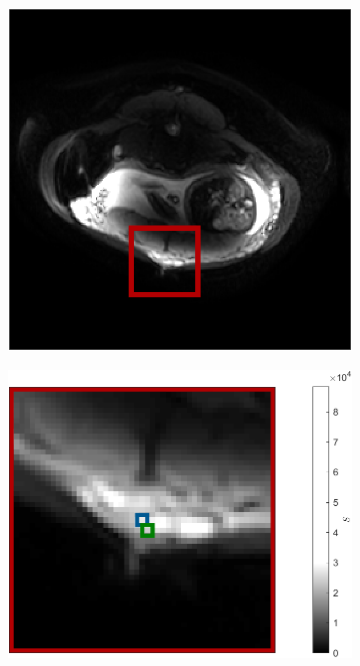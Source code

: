 \begin{figure}
\begin{centering}
\begin{subfigure}{0.4\textwidth}
\begin{centering}
                        \includegraphics[width=\textwidth]{diagrams/results-mri/real-placenta/example-placenta-mri.png}
                        \caption{}
                    \end{centering}
                \end{subfigure}
                \vspace{4mm}
                \begin{subfigure}{0.5\textwidth}
                    \begin{centering}
                        \includegraphics[width=\textwidth]{diagrams/results-mri/real-placenta/example-placenta-mri_zoomed.png}

\end{centering}
\end{subfigure}
\end{centering}
\end{figure}
